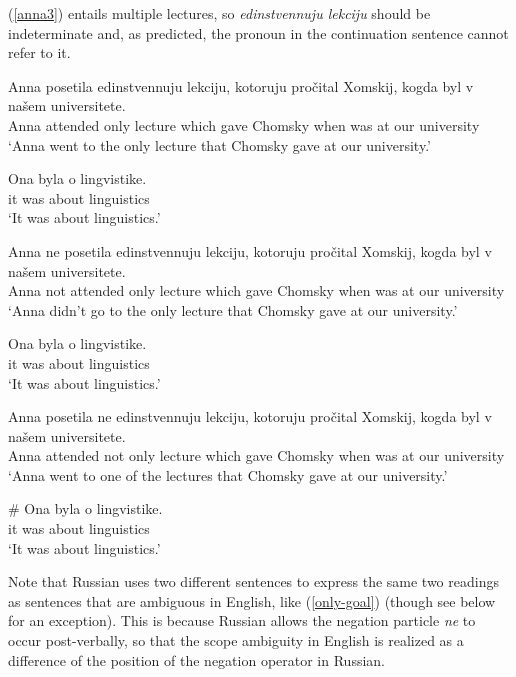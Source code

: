 (\ref{anna3}) entails multiple lectures, so \textit{edinstvennuju lekciju} should be indeterminate and, as predicted, the pronoun in the continuation sentence cannot refer to it.

\begin{exe}
	\ex \label{anna1} \begin{xlist}
		\ex \gll Anna posetila edinstvennuju lekciju, kotoruju pro\v{c}ital Xomskij, kogda byl v na\v{s}em universitete.\\
		Anna attended only lecture which gave Chomsky when was at our university\\
		\glt `Anna went to the only lecture that Chomsky gave at our university.'

		\ex \gll Ona byla o lingvistike.\\
		it was about linguistics\\
		\glt `It was about linguistics.'
	\end{xlist}

	\ex \label{anna2} \begin{xlist}
		\ex \gll Anna ne posetila edinstvennuju lekciju, kotoruju pro\v{c}ital Xomskij, kogda byl v na\v{s}em universitete.\\
		Anna not attended only lecture which gave Chomsky when was at our university\\
		\glt `Anna didn't go to the only lecture that Chomsky gave at our university.'

		\ex \gll Ona byla o lingvistike.\\
		it was about linguistics\\
		\glt `It was about linguistics.'
	\end{xlist}

	\ex \label{anna3} \begin{xlist}
		\ex \gll Anna posetila ne edinstvennuju lekciju, kotoruju pro\v{c}ital Xomskij, kogda byl v na\v{s}em universitete.\\
		Anna attended not only lecture which gave Chomsky when was at our university\\
		\glt `Anna went to one of the lectures that Chomsky gave at our university.'

		\ex \gll \# Ona byla o lingvistike.\\
		{} it was about linguistics\\
		\glt `It was about linguistics.'
	\end{xlist}
\end{exe}

Note that Russian uses two different sentences to express the same two readings as sentences that are ambiguous in English, like (\ref{only-goal}) (though see below for an exception). This is because Russian allows the negation particle \textit{ne} to occur post-verbally, so that the scope ambiguity in English is realized as a difference of the position of the negation operator in Russian.

